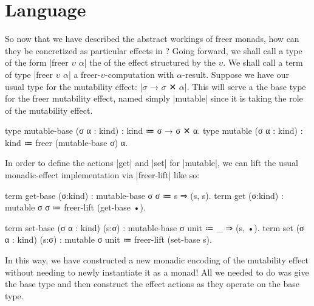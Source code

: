 \section{Language \LangE}

So now that we have described the abstract workings of freer monads, how can they be concretized as particular effects in \LangE?
Going forward, we shall call a type of the form \code|freer $υ$ $α$| the  of the effect structured by the  $υ$.
We shall call a term of type \code|freer $υ$ $α$| a freer-$υ$-computation with $α$-result.
Suppose we have our usual type for the mutability effect: \code|$σ$ → $σ$ ✕ $α$|.
This will serve a the base type for the freer mutability effect, named simply \code|mutable| since it is taking the role of the mutability effect.
%
\begin{snippet}
type mutable-base (σ α : kind) : kind ≔ σ → σ ✕ α.
type mutable      (σ α : kind) : kind ≔ freer (mutable-base σ) α.
\end{snippet}
%
In order to define the actions \code|get| and \code|set| for \code|mutable|, we can lift the usual monadic-effect implementation via \code|freer-lift| like so:
%
\begin{snippet}
term get-base (σ:kind) : mutable-base σ σ ≔ s ⇒ (s, s).
term get      (σ:kind) : mutable      σ σ ≔ freer-lift (get-base •).

term set-base (σ α : kind) (s:σ) : mutable-base σ unit ≔ _ ⇒ (s, •).
term set      (σ α : kind) (s:σ) : mutable      σ unit ≔ freer-lift
                                                          (set-base s).
\end{snippet}
%
In this way, we have constructed a new monadic encoding of the mutability effect without needing to newly instantiate it as a monad!
All we needed to do was give the base type and then construct the effect actions as they operate on the base type.

